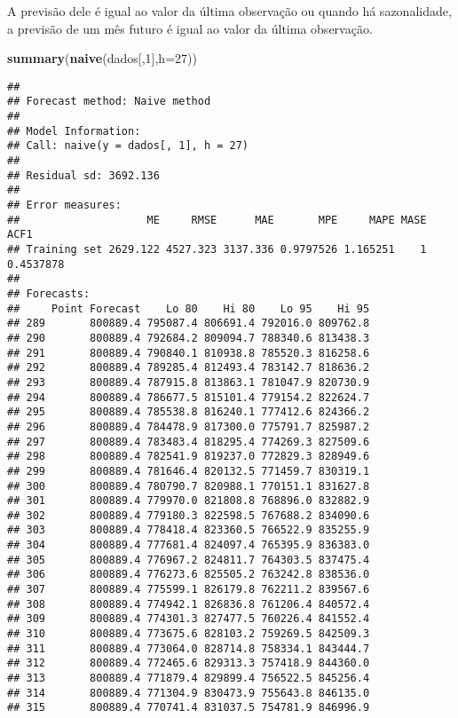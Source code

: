 \documentclass[]{article}
\newenvironment{Shaded}{\begin{snugshade}}{\end{snugshade}}
\newcommand{\DataTypeTok}[1]{\textcolor[rgb]{0.13,0.29,0.53}{#1}}
\newcommand{\DecValTok}[1]{\textcolor[rgb]{0.00,0.00,0.81}{#1}}
\newcommand{\KeywordTok}[1]{\textcolor[rgb]{0.13,0.29,0.53}{\textbf{#1}}}
\newcommand{\NormalTok}[1]{#1}
\begin{document}
A previsão dele é igual ao valor da última observação ou quando há
sazonalidade, a previsão de um mês futuro é igual ao valor da última
observação.

\begin{Shaded}
\begin{Highlighting}[]
\KeywordTok{summary}\NormalTok{(}\KeywordTok{naive}\NormalTok{(dados[,}\DecValTok{1}\NormalTok{],}\DataTypeTok{h=}\DecValTok{27}\NormalTok{))}
\end{Highlighting}
\end{Shaded}

\begin{verbatim}
## 
## Forecast method: Naive method
## 
## Model Information:
## Call: naive(y = dados[, 1], h = 27) 
## 
## Residual sd: 3692.136 
## 
## Error measures:
##                    ME     RMSE      MAE       MPE     MAPE MASE      ACF1
## Training set 2629.122 4527.323 3137.336 0.9797526 1.165251    1 0.4537878
## 
## Forecasts:
##     Point Forecast    Lo 80    Hi 80    Lo 95    Hi 95
## 289       800889.4 795087.4 806691.4 792016.0 809762.8
## 290       800889.4 792684.2 809094.7 788340.6 813438.3
## 291       800889.4 790840.1 810938.8 785520.3 816258.6
## 292       800889.4 789285.4 812493.4 783142.7 818636.2
## 293       800889.4 787915.8 813863.1 781047.9 820730.9
## 294       800889.4 786677.5 815101.4 779154.2 822624.7
## 295       800889.4 785538.8 816240.1 777412.6 824366.2
## 296       800889.4 784478.9 817300.0 775791.7 825987.2
## 297       800889.4 783483.4 818295.4 774269.3 827509.6
## 298       800889.4 782541.9 819237.0 772829.3 828949.6
## 299       800889.4 781646.4 820132.5 771459.7 830319.1
## 300       800889.4 780790.7 820988.1 770151.1 831627.8
## 301       800889.4 779970.0 821808.8 768896.0 832882.9
## 302       800889.4 779180.3 822598.5 767688.2 834090.6
## 303       800889.4 778418.4 823360.5 766522.9 835255.9
## 304       800889.4 777681.4 824097.4 765395.9 836383.0
## 305       800889.4 776967.2 824811.7 764303.5 837475.4
## 306       800889.4 776273.6 825505.2 763242.8 838536.0
## 307       800889.4 775599.1 826179.8 762211.2 839567.6
## 308       800889.4 774942.1 826836.8 761206.4 840572.4
## 309       800889.4 774301.3 827477.5 760226.4 841552.4
## 310       800889.4 773675.6 828103.2 759269.5 842509.3
## 311       800889.4 773064.0 828714.8 758334.1 843444.7
## 312       800889.4 772465.6 829313.3 757418.9 844360.0
## 313       800889.4 771879.4 829899.4 756522.5 845256.4
## 314       800889.4 771304.9 830473.9 755643.8 846135.0
## 315       800889.4 770741.4 831037.5 754781.9 846996.9
\end{verbatim}
\end{document}
